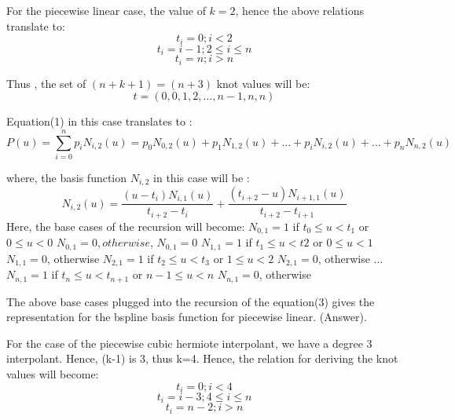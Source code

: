 \documentclass{article}
\begin{document}
For the piecewise linear case, the value of $k=2$, hence the above relations translate to: 
\[ t_i = 0; i < 2\]
\[ t_i = i-1; 2 \leq i \leq n\]
\[ t_i = n; i > n\]

Thus , the set of $(n+k+1) = (n+3)$ knot values will be: \newline
\[ t = (0,0,1,2, \dots, n-1, n,n)\]

Equation(1) in this case translates to : \newline
\[ P(u) = \sum_{i=0}^n p_i N_{i,2}(u) = p_0 N_{0,2}(u) + p_1 N_{1,2}(u) + \dots + p_i N_{i,2}(u) + \dots + p_n N_{n,2}(u) \]

where, the basis function $N_{i,2}$ in this case will be : \newline
\begin{equation}
   N_{i,2}(u) = \dfrac{(u - t_i) N_{i,1}(u)}{t_{i+2} - t_i} + \dfrac{(t_{i+2} - u)N_{i+1,1}(u)}{t_{i+2} - t_{i+1}}
\end{equation}
Here, the base cases of the recursion will become: \newline
$N_{0,1} = 1 $ if $t_0 \leq u < t_1 $ or $0 \leq u < 0$ \newline
$N_{0,1} = 0, otherwise$, \newline
$N_{0,1} = 0$ \newline \newline
$N_{1,1} = 1$ if $t_1 \leq u < t2$ or $0 \leq u < 1$ \newline
$N_{1,1} = 0$, otherwise \newline \newline
$N_{2,1} = 1$ if $t_2 \leq u < t_3$ or $1 \leq u < 2$ \newline
$N_{2,1} = 0$, otherwise \newline \newline
$\dots$ \newline
$N_{n,1} = 1$ if $t_n \leq u < t_{n+1}$ or $n-1 \leq u < n$  \newline
$N_{n,1} = 0$, otherwise \newline \newline

The above base cases plugged into the recursion of the equation(3) gives the representation for the bspline basis function for piecewise linear. (Answer). \newline

For the case of the piecewise cubic hermiote interpolant, we have a degree 3 interpolant. Hence, (k-1) is 3, thus k=4. Hence, the relation for deriving the knot values will become: \newline
\[ t_i = 0; i < 4\]
\[ t_i = i-3; 4 \leq i \leq n \]
\[ t_i = n-2; i > n\]
\end{document}
